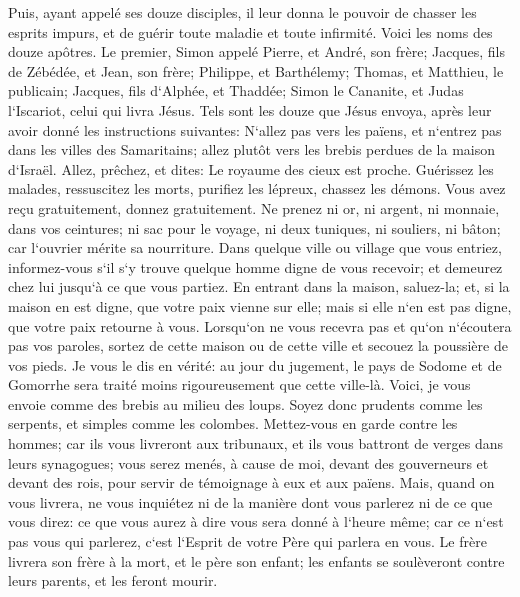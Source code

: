 \verse Puis, ayant appelé ses douze disciples, il leur donna le pouvoir de chasser les esprits impurs, et de guérir toute maladie et toute infirmité. 
\verse Voici les noms des douze apôtres. Le premier, Simon appelé Pierre, et André, son frère; Jacques, fils de Zébédée, et Jean, son frère; 
\verse Philippe, et Barthélemy; Thomas, et Matthieu, le publicain; Jacques, fils d`Alphée, et Thaddée; 
\verse Simon le Cananite, et Judas l`Iscariot, celui qui livra Jésus. 
\verse Tels sont les douze que Jésus envoya, après leur avoir donné les instructions suivantes: N`allez pas vers les païens, et n`entrez pas dans les villes des Samaritains; 
\verse allez plutôt vers les brebis perdues de la maison d`Israël. 
\verse Allez, prêchez, et dites: Le royaume des cieux est proche. 
\verse Guérissez les malades, ressuscitez les morts, purifiez les lépreux, chassez les démons. Vous avez reçu gratuitement, donnez gratuitement. 
\verse Ne prenez ni or, ni argent, ni monnaie, dans vos ceintures; 
\verse ni sac pour le voyage, ni deux tuniques, ni souliers, ni bâton; car l`ouvrier mérite sa nourriture. 
\verse Dans quelque ville ou village que vous entriez, informez-vous s`il s`y trouve quelque homme digne de vous recevoir; et demeurez chez lui jusqu`à ce que vous partiez. 
\verse En entrant dans la maison, saluez-la; 
\verse et, si la maison en est digne, que votre paix vienne sur elle; mais si elle n`en est pas digne, que votre paix retourne à vous. 
\verse Lorsqu`on ne vous recevra pas et qu`on n`écoutera pas vos paroles, sortez de cette maison ou de cette ville et secouez la poussière de vos pieds. 
\verse Je vous le dis en vérité: au jour du jugement, le pays de Sodome et de Gomorrhe sera traité moins rigoureusement que cette ville-là. 
\verse Voici, je vous envoie comme des brebis au milieu des loups. Soyez donc prudents comme les serpents, et simples comme les colombes. 
\verse Mettez-vous en garde contre les hommes; car ils vous livreront aux tribunaux, et ils vous battront de verges dans leurs synagogues; 
\verse vous serez menés, à cause de moi, devant des gouverneurs et devant des rois, pour servir de témoignage à eux et aux païens. 
\verse Mais, quand on vous livrera, ne vous inquiétez ni de la manière dont vous parlerez ni de ce que vous direz: ce que vous aurez à dire vous sera donné à l`heure même; 
\verse car ce n`est pas vous qui parlerez, c`est l`Esprit de votre Père qui parlera en vous. 
\verse Le frère livrera son frère à la mort, et le père son enfant; les enfants se soulèveront contre leurs parents, et les feront mourir. 
